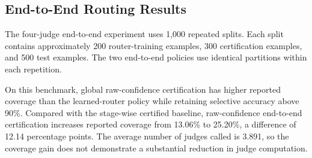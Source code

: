 \documentclass[11pt]{article}
\begin{document}

\subsection{End-to-End Routing Results}
The four-judge end-to-end experiment uses 1,000 repeated splits. Each split contains approximately 200 router-training examples, 300 certification examples, and 500 test examples. The two end-to-end policies use identical partitions within each repetition.

\begin{table}[t]
\centering
\small
{}
\caption{End-to-end routing results. Accuracy is conditional on answering; target success is a per-repetition empirical quantity.}
\label{tab:global-results}
\end{table}

On this benchmark, global raw-confidence certification has higher reported coverage than the learned-router policy while retaining selective accuracy above 90\%. Compared with the stage-wise certified baseline, raw-confidence end-to-end certification increases reported coverage from 13.06\% to 25.20\%, a difference of 12.14 percentage points. The average number of judges called is 3.891, so the coverage gain does not demonstrate a substantial reduction in judge computation.
\end{document}
